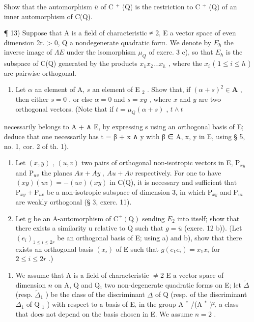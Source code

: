 Show that the automorphism \(\bar{u}\) of C \(^{+}\) (Q) is the restriction to C \(^{+}\) (Q) of an inner automorphism of C(Q).

¶ 13) Suppose that A is a field of characteristic ≠ 2, E a vector space of even dimension 2r. \textgreater{} 0, Q a nondegenerate quadratic form. We denote by \(E_{h}\) the inverse image of \(\Lambda E\) under the isomorphism \(\mu_{Q}\) of exerc. 3 c), so that \(E_{h}\) is the subspace of C(Q) generated by the products \(x_{1}x_{2}\ldots x_{h}\) , where the \(x_{i}\) ( \(1 \leqslant i \leqslant h\) ) are pairwise orthogonal.

\begin{enumerate}
\def\labelenumi{\alph{enumi})}
\tightlist
\item
  Let \(\alpha\) an element of A, \(s\) an element of E \(_2\) . Show that, if \((\alpha + s)^2 \in \mathbf{A}\) , then either \(s = 0\) , or else \(\alpha = 0\) and \(s = xy\) , where \(x\) and \(y\) are two orthogonal vectors. (Note that if \(t = \mu_Q(\alpha + s)\) , \(t \wedge t\)
\end{enumerate}

necessarily belongs to A + ∧ E, by expressing s using an orthogonal basis of E; deduce that one necessarily has t = β + x ∧ y with β ∈ A, x, y in E, using § 5, no. 1, cor. 2 of th. 1).

\begin{enumerate}
\def\labelenumi{\alph{enumi})}
\setcounter{enumi}{1}
\item
  Let \((x, y)\) , \((u, v)\) two pairs of orthogonal non-isotropic vectors in E, \(\mathrm{P}_{xy}\) and \(\mathrm{P}_{uv}\) the planes \(Ax + Ay\) , \(Au + Av\) respectively. For one to have \((xy)(uv) = -(uv)(xy)\) in C(Q), it is necessary and sufficient that \(\mathrm{P}_{xy} + \mathrm{P}_{uv}\) be a non-isotropic subspace of dimension 3, in which \(\mathrm{P}_{xy}\) and \(\mathrm{P}_{uv}\) are weakly orthogonal (§ 3, exerc. 11).
\item
  Let g be an A-automorphism of \(\mathrm{C}^{+}(\mathrm{Q})\) sending \(E_{2}\) into itself; show that there exists a similarity u relative to Q such that \(g = \bar{u}\) (exerc. 12 b)). (Let \((e_{i})_{1 \leqslant i \leqslant 2r}\) be an orthogonal basis of E; using a) and b), show that there exists an orthogonal basis \((x_{i})\) of E such that \(g(e_{1}e_{i}) = x_{1}x_{i}\) for \(2 \leqslant i \leqslant 2r\) .)
\end{enumerate}

\begin{enumerate}
\def\labelenumi{\arabic{enumi})}
\setcounter{enumi}{13}
\tightlist
\item
  We assume that A is a field of characteristic \(\neq 2\) E a vector space of dimension \(n\) on A, Q and Q₁ two non-degenerate quadratic forms on E; let \(\tilde{\Delta}\) (resp. \(\tilde{\Delta}_{1}\) ) be the class of the discriminant \(\Delta\) of Q (resp. of the discriminant \(\Delta_{1}\) of Q \(_{1}\) ) with respect to a basis of E, in the group A \(^{*}\) /(A \(^{*}\) )², a class that does not depend on the basis chosen in E. We assume \(n = 2\) .
\end{enumerate}

